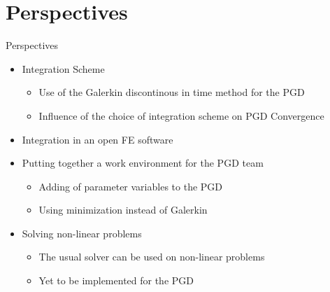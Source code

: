 \documentclass[12pt]{beamer}
\newcommand\FontPersp{\fontsize{10}{12}\selectfont}
\begin{document}
\section{Perspectives}

\begin{frame}{Perspectives}
\FontPersp
	\begin{itemize}
		\item Integration Scheme
			\begin{itemize}
			\FontPersp
			\item Use of the Galerkin discontinous in time method for the PGD
			\item Influence of the choice of integration scheme on PGD Convergence
			\end{itemize}
		\item Integration in an open FE software
		\item Putting together a work environment for the PGD team
			\begin{itemize}
			\FontPersp
			\item Adding of parameter variables to the PGD %
			\item Using minimization instead of Galerkin
			\end{itemize}
		\item Solving non-linear problems
			\begin{itemize}
			\FontPersp
			\item The usual solver can be used on non-linear problems
			\item Yet to be implemented for the PGD
			\end{itemize}
	\end{itemize}
\end{frame}
\end{document}
